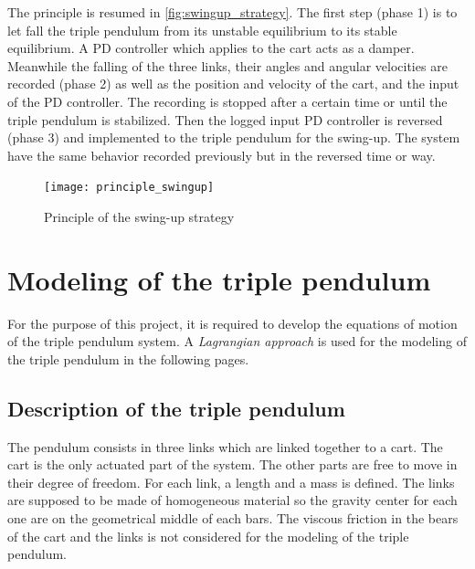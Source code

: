 \documentclass[a4paper,12pt,twoside]{article}
\begin{document}
The principle is resumed in \autoref{fig:swingup_strategy}. The first step (phase 1) is to let fall the triple pendulum from its unstable equilibrium to its stable equilibrium. A PD controller which applies to the cart acts as a damper. Meanwhile the falling of the three links, their angles and angular velocities are recorded (phase 2) as well as the position and velocity of the cart, and the input of the PD controller. The recording is stopped after a certain time or until the triple pendulum is stabilized. Then the logged input PD controller is reversed (phase 3) and implemented to the triple pendulum for the swing-up. The system have the same behavior recorded previously but in the reversed time or way.
\begin{figure}[ht]
	\centering
	\texttt{[image: principle\_swingup]}
	\caption{Principle of the swing-up strategy}
	\label{fig:swingup_strategy}
\end{figure}
\section{Modeling of the triple pendulum}
For the purpose of this project, it is required to develop the equations of motion of the triple pendulum system. A \emph{Lagrangian approach} is used for the modeling of the triple pendulum in the following pages.

\subsection{Description of the triple pendulum}
The pendulum consists in three links which are linked together to a cart. The cart is the only actuated part of the system. The other parts are free to move in their degree of freedom. For each link, a length and a mass is defined. The links are supposed to be made of homogeneous material so the gravity center for each one are on the geometrical middle of each bars. The viscous friction in the bears of the cart and the links is not considered for the modeling of the triple pendulum.
\end{document}
